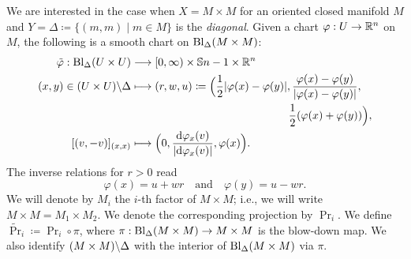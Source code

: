 \documentclass[\MainFolder/Text.tex]{subfiles}
\begin{document}
We are interested in the case when $X = M\times M$ for an oriented closed manifold $M$ and $Y = \Delta \coloneqq \{(m,m) \mid m\in M\}$ is the \emph{diagonal}.
Given a chart $\varphi: U \rightarrow \mathbb{R}^n$ on~$M$, the following is a smooth chart on $\mathrm{Bl}_\Delta(M\times M)$:
\begin{equation} \label{Eq:BlowUpChart}
\begin{aligned}
\tilde{\varphi}: \Bl_{\Diag}(U\times U) & \longrightarrow [0,\infty) \times \Sph{n-1} \times \R^n \\
(x,y)\in (U\times U)\backslash \Diag & \longmapsto  (r,w,u)\coloneqq \begin{multlined}[t] \Bigl(\frac{1}{2}\Abs{\varphi(x)-\varphi(y)}, \frac{\varphi(x)-\varphi(y)}{\Abs{\varphi(x)-\varphi(y)}},\\\frac{1}{2}(\varphi(x)+\varphi(y))\Bigr),\end{multlined} \\
[(v,-v)]_{(x,x)} &\longmapsto \Bigl(0,\frac{\Dd \varphi_x(v)}{\Abs{\Dd \varphi_x(v)}},\varphi(x)\Bigr).
\end{aligned}
\end{equation}
The inverse relations for $r>0$ read
\begin{equation*} \label{Eq:BlowupRelations}
\varphi(x) = u+w r\quad\text{and}\quad\varphi(y)=u-w r.
\end{equation*}
We will denote by $M_i$ the $i$-th factor of $M\times M$; i.e., we will write $M \times M = M_1 \times M_2$.
We denote the corresponding projection by $\Pr_i$.
We define $\widetilde{\Pr}_i \coloneqq \Pr_i\circ\pi$, where $\pi: \mathrm{Bl}_\Delta(M\times M) \rightarrow M \times M$ is the blow-down map.
We also identify $(M\times M)\backslash \Delta$ with the interior of $\mathrm{Bl}_\Delta(M\times M)$ via $\pi$.
\end{document}
